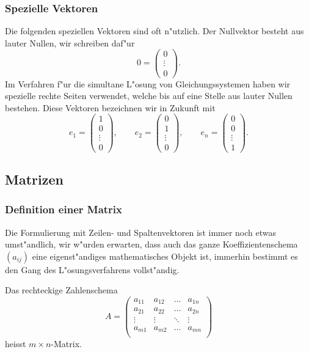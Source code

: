 \subsubsection{Spezielle Vektoren\label{speziellevektoren}}
Die folgenden speziellen Vektoren sind oft n"utzlich.
Der Nullvektor besteht
aus lauter Nullen, wir schreiben daf"ur
\[
0=\begin{pmatrix}0\\\vdots\\0\end{pmatrix}.
\]
Im Verfahren f"ur die simultane L"osung von Gleichungssystemen haben
wir spezielle rechte Seiten verwendet, welche bis auf eine Stelle aus lauter
Nullen bestehen.
Diese Vektoren bezeichnen wir in Zukunft mit
\[
e_1=\begin{pmatrix}1\\0\\\vdots\\0\end{pmatrix},
\qquad
e_2=\begin{pmatrix}0\\1\\\vdots\\0\end{pmatrix},
\qquad
e_n=\begin{pmatrix}0\\0\\\vdots\\1\end{pmatrix}.
\]

\subsection{Matrizen}
\subsubsection{Definition einer Matrix}
Die Formulierung mit Zeilen- und Spaltenvektoren ist immer noch etwas umst"andlich,
wir w"urden erwarten, dass auch das ganze Koeffizientenschema $(a_{ij})$
eine eigenst"andiges mathematisches Objekt ist, immerhin bestimmt es den
Gang des L"osungsverfahrens vollst"andig.

\begin{definition}
Das rechteckige Zahlenschema
\[
A=
\begin{pmatrix}
a_{11}&a_{12}&\dots&a_{1n}\\
a_{21}&a_{22}&\dots&a_{2n}\\
\vdots&\vdots&\ddots&\vdots\\
a_{m1}&a_{m2}&\dots&a_{mn}\\
\end{pmatrix}
\]
heisst $m\times n$-Matrix.
\end{definition}

